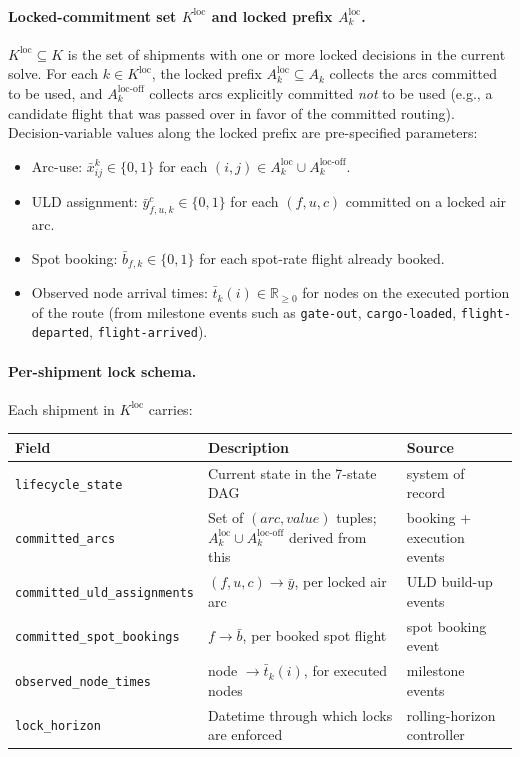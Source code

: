 \documentclass[11pt,a4paper]{article}
\theoremstyle{definition}
\begin{document}
\paragraph{Locked-commitment set $K^{\text{loc}}$ and locked prefix $A_k^{\text{loc}}$.}
$K^{\text{loc}} \subseteq K$ is the set of shipments with one or more locked decisions
in the current solve. For each $k \in K^{\text{loc}}$, the locked prefix
$A_k^{\text{loc}} \subseteq A_k$ collects the arcs committed to be used, and
$A_k^{\text{loc-off}}$ collects arcs explicitly committed \emph{not} to be used
(e.g., a candidate flight that was passed over in favor of the committed routing).
Decision-variable values along the locked prefix are pre-specified parameters:
\begin{itemize}[noitemsep]
  \item Arc-use: $\bar{x}_{ij}^k \in \{0,1\}$ for each $(i,j) \in A_k^{\text{loc}} \cup A_k^{\text{loc-off}}$.
  \item ULD assignment: $\bar{y}_{f,u,k}^c \in \{0,1\}$ for each $(f, u, c)$ committed
        on a locked air arc.
  \item Spot booking: $\bar{b}_{f,k} \in \{0,1\}$ for each spot-rate flight already
        booked.
  \item Observed node arrival times: $\bar{t}_k(i) \in \mathbb{R}_{\geq 0}$ for nodes
        on the executed portion of the route (from milestone events such as
        \texttt{gate-out}, \texttt{cargo-loaded}, \texttt{flight-departed},
        \texttt{flight-arrived}).
\end{itemize}

\paragraph{Per-shipment lock schema.}
Each shipment in $K^{\text{loc}}$ carries:
\begin{center}
\begin{tabular}{lp{7cm}l}
\toprule
Field & Description & Source \\
\midrule
\texttt{lifecycle\_state} & Current state in the 7-state DAG & system of record \\
\texttt{committed\_arcs} & Set of $(arc, value)$ tuples; $A_k^{\text{loc}} \cup A_k^{\text{loc-off}}$ derived from this & booking + execution events \\
\texttt{committed\_uld\_assignments} & $(f, u, c) \to \bar{y}$, per locked air arc & ULD build-up events \\
\texttt{committed\_spot\_bookings} & $f \to \bar{b}$, per booked spot flight & spot booking event \\
\texttt{observed\_node\_times} & node $\to \bar{t}_k(i)$, for executed nodes & milestone events \\
\texttt{lock\_horizon} & Datetime through which locks are enforced & rolling-horizon controller \\
\bottomrule
\end{tabular}
\end{center}
\end{document}
